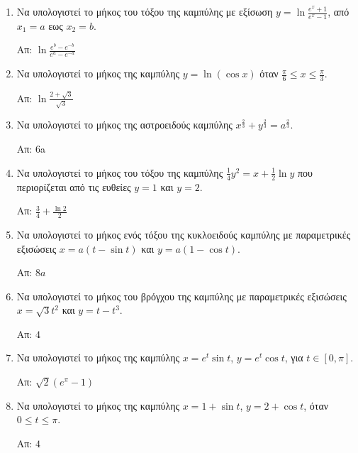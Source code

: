 


\everymath{\displaystyle}
\thispagestyle{empty}



\begin{center}
\end{center}

\vspace{\baselineskip}

\begin{enumerate}

	\item Να υπολογιστεί το μήκος του τόξου της καμπύλης με εξίσωση $ y =
		\ln{\frac{e^{x} + 1}{e^{x} - 1}}$, από $ x_{1} = a $ εως $ x_{2} = b $.

		\hfill Απ: $ \ln{\frac{e^{b} - e^{-b}}{e^{a} - e^{-a}}} $

	\item Να υπολογιστεί το μήκος της καμπύλης $y=\ln(\cos x)$ όταν 
        $\frac{\pi}{6}\leq x \leq \frac{\pi}{3}$.

		\hfill Απ: $\ln\frac{2+\sqrt{3}}{\sqrt{3}}$

	\item Να υπολογιστεί το μήκος της αστροειδούς καμπύλης $ x^{\frac{2}{3}}
		+ y^{\frac{2}{3}} = a^{\frac{2}{3}} $.

		\hfill Απ: 6a

	\item Να υπολογιστεί το μήκος του τόξου της καμπύλης $ \frac{1}{4} y^{2} = x +
		\frac{1}{2} \ln{y} $ που περιορίζεται από τις ευθείες $ y = 1 $ και $ y =
		2$.

		\hfill Απ: $ \frac{3}{4} + \frac{\ln{2}}{2} $

    \item Να υπολογιστεί το μήκος ενός τόξου της κυκλοειδούς καμπύλης με παραμετρικές 
        εξισώσεις $ x = a(t - \sin{t}) $ και $ y = a(1- \cos{t}) $.

        \hfill Απ: $ 8a $ 

    \item Να υπολογιστεί το μήκος του βρόγχου της καμπύλης με παραμετρικές εξισώσεις 
        $ x= \sqrt{3} t^{2} $ και $ y = t - t^{3} $.

        \hfill Απ: $ 4 $ 

	\item Να υπολογιστεί το μήκος της καμπύλης $ x = e^{t} \sin{t} $, $ y = e^{t}
		\cos{t} $, για $ t \in [0, \pi] $.

		\hfill Απ: $ \sqrt{2} (e^{\pi} - 1)  $

	\item Να υπολογιστεί το μήκος της καμπύλης $x=1+\sin t$, $y=2+\cos t$, όταν 
        $0\leq t\leq \pi$.

		\hfill Απ: $4$

\end{enumerate}




